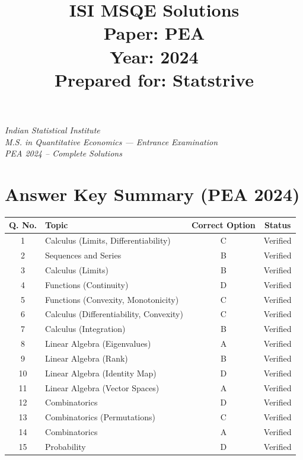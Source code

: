 \documentclass[11pt]{article}
\title{\textbf{ISI MSQE Solutions} \\ \large Paper: PEA \\ Year: 2024 \\ Prepared for: \textbf{Statstrive}}
\author{}
\date{}
\begin{document}
\maketitle
\thispagestyle{empty}
\vfill
\begin{center}
\textit{Indian Statistical Institute} \\
\textit{M.S. in Quantitative Economics --- Entrance Examination} \\
\textit{PEA 2024 -- Complete Solutions}
\end{center}
\vfill
\newpage

\section*{Answer Key Summary (PEA 2024)}

\begin{center}
\begin{longtable}{c l c c}
\toprule
\textbf{Q. No.} & \textbf{Topic} & \textbf{Correct Option} & \textbf{Status} \\
\midrule
\endhead
1  & Calculus (Limits, Differentiability)     & C & Verified \\
2  & Sequences and Series                     & B & Verified \\
3  & Calculus (Limits)                         & B & Verified \\
4  & Functions (Continuity)                    & D & Verified \\
5  & Functions (Convexity, Monotonicity)       & C & Verified \\
6  & Calculus (Differentiability, Convexity)   & C & Verified \\
7  & Calculus (Integration)                    & B & Verified \\
8  & Linear Algebra (Eigenvalues)              & A & Verified \\
9  & Linear Algebra (Rank)                     & B & Verified \\
10 & Linear Algebra (Identity Map)             & D & Verified \\
11 & Linear Algebra (Vector Spaces)            & A & Verified \\
12 & Combinatorics                             & D & Verified \\
13 & Combinatorics (Permutations)              & C & Verified \\
14 & Combinatorics                             & A & Verified \\
15 & Probability                               & D & Verified \\

\end{longtable}
\end{center}
\end{document}
